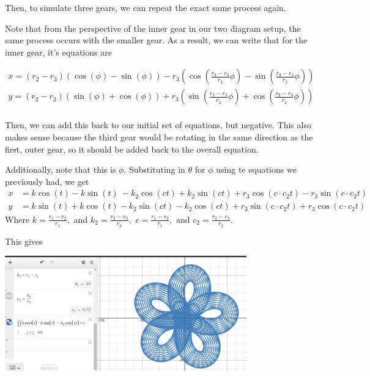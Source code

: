 \documentclass{article}
\begin{document}
Then, to simulate three gears, we can repeat the exact same process again. 

Note that from the perspective of the inner gear in our two diagram setup, the same process occurs with the smaller gear. As a result, we can write that for the inner gear, it's equations are 

\begin{align*}
    x = (r_2 - r_3) (\cos(\phi) - \sin(\phi)) - r_3  \left( \cos\left(\frac{r_2 - r_3}{r_2}  \phi \right) - \sin\left(\frac{r_2 - r_3}{r_2}  \phi \right) \right) \\
    y = (r_2 - r_2) \left(\sin(\phi) + \cos(\phi) \right) + r_3 \left(\sin\left(\frac{r_2 - r_3}{r_2}  \phi \right) + \cos\left(\frac{r_2 - r_3}{r_2}  \phi \right) \right) \\
\end{align*}

Then, we can add this back to our initial set of equations, but negative. This also makes sense because the third gear would be rotating in the same direction as the first, outer gear, so it should be added back to the overall equation. 

Additionally, note that this is $\phi.$ Substituting in $\theta$ for $\phi$ using te equations we previously had, we get
\[
\begin{aligned}
    x &= k\cos\left(t\right)-k\sin\left(t\right)\ -k_{2}\cos\left(ct\right)+k_{2}\sin\left(ct\right) + r_{3}\cos\left(c \cdot c_{2}t\right)-r_{3}\sin\left(c \cdot c_{2}t\right) \\
    y &= k\sin\left(t\right)+k\cos\left(t\right) -k_{2}\sin\left(ct\right)-k_{2}\cos\left(ct\right)+r_{3}\sin\left(c \cdot c_{2}t\right)+r_{3}\cos\left(c\cdot c_{2}t\right)
\end{aligned}
\]
Where $k = \frac{r_1 - r_2}{r_1},$ and $k_2 = \frac{r_2 - r_3}{r_2},$ $c = \frac{r_1 - r_2}{r_1},$ and $c_2 = \frac{r_2 - r_3}{r_2}$.

This gives

\begin{center}
\includegraphics[height=5cm]{images/3-Gear Spiro.png}
\end{center}
\end{document}
